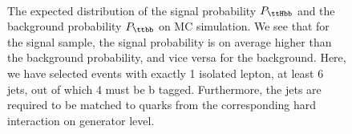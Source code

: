 \begin{figure}
\begin{centering}
\\
\caption{The expected distribution of the signal probability $P_{\ttHbb}$ and the background probability $P_{\ttbb}$ on MC simulation. We see that for the signal sample, the signal probability is on average higher than the background probability, and vice versa for the background. Here, we have selected events with exactly 1 isolated lepton, at least 6 jets, out of which 4 must be b tagged. Furthermore, the jets are required to be matched to quarks from the corresponding hard interaction on generator level.}
\label{fig:mem_proba}
\end{centering}
\end{figure}

